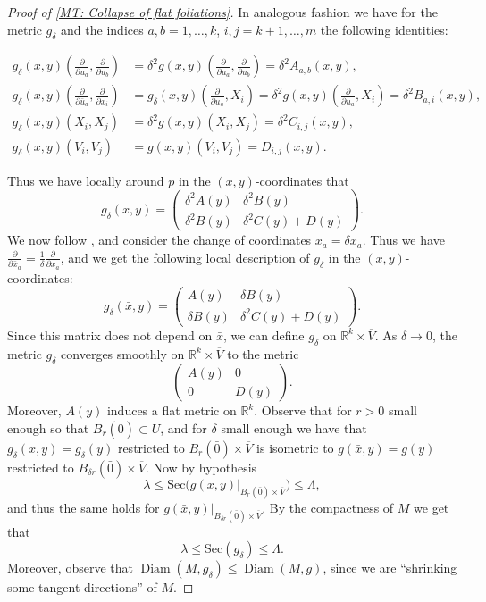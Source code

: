 \documentclass[12pt,a4paper,reqno]{amsart}
\theoremstyle{definition}
\numberwithin{equation}{section}
\newcommand{\R}{\mathbb{R}} %
\newcommand{\Sec}{\mathrm{Sec}}
\DeclareMathOperator{\diam}{Diam}
\begin{document}
\begin{proof}[Proof of \th\ref{MT: Collapse of flat foliations}]
In analogous fashion we have for the metric $g_\delta$ and the indices $a,b=1,\ldots,k$, $i,j=k+1,\ldots,m$ the following identities:
\begin{linenomath}
\begin{align*}
g_\delta(x,y)\left(  \frac{\partial}{\partial u_a},\frac{\partial}{\partial u_b}\right) &= \delta^2 g(x,y)\left(\frac{\partial}{\partial u_a},\frac{\partial}{\partial u_b}\right) =\delta^2 A_{a,b}(x,y),\\
g_\delta(x,y)\left( \frac{\partial}{\partial \bar{u}_a},\frac{\partial}{\partial x_i}\right) &=g_\delta(x,y)\left(\frac{\partial}{\partial u_a},X_i\right) =\delta^2 g(x,y)\left(\frac{\partial}{\partial u_a},X_i\right) = \delta^2 B_{a,i}(x,y),\\
g_\delta(x,y)(X_i,X_j) &= \delta^2g(x,y)(X_i,X_j) = \delta^2 C_{i,j}(x,y),\\
g_\delta(x,y)(V_i,V_j)&= g(x,y)(V_i,V_j) = D_{i,j}(x,y).
\end{align*}
\end{linenomath}
Thus we have locally around $p$ in the $(x,y)$-coordinates that 
\[
g_\delta(x,y)= \begin{pmatrix}
  \delta^2 A(y) & \delta^2 B(y) \\
  \delta^2 B(y) & \delta^2 C(y)+ D(y)
\end{pmatrix}.
\]
We now follow \cite[Proof of Theorem 2.1]{CheegerGromov1986}, and consider the change of coordinates $\bar{x}_a = \delta x_a$. Thus we have $\frac{\partial}{\partial \bar{x}_a} = \frac{1}{\delta}\frac{\partial}{\partial x_a}$, and we get the following local description of $g_\delta$ in the $(\bar{x},y)$-coordinates:
\[
g_\delta(\bar{x},y) = \begin{pmatrix}
  A(y) & \delta B(y) \\
  \delta B(y) & \delta^2 C(y)+ D(y)
\end{pmatrix}.
\]
Since this matrix does not depend on $\bar{x}$, we can define $g_\delta$ on $\R^{k}\times \overline{V}$. As $\delta\to 0$, the metric $g_\delta$ converges smoothly on $\R^{k}\times \overline{V}$ to the metric
\[
\begin{pmatrix}
A(y) & 0 \\
0 & D(y)
\end{pmatrix}.
\]
Moreover, $A(y)$ induces a flat metric on $\R^{k}$. Observe that for $r>0$ small enough so that $B_r(\bar{0})\subset \overline{U}$, and for $\delta$ small enough we have that $g_\delta(x,y) = g_\delta(y)$ restricted to $B_{r}(\bar{0})\times\overline{V}$ is isometric to $g(\bar{x},y) = g(y)$ restricted to $B_{\delta r}(\bar{0})\times\overline{V}$. Now by hypothesis
\[
\lambda\leq \Sec\Big(g(x,y)|_{B_{r}(\bar{0})\times\overline{V}}\Big)\leq \Lambda,
\]
and thus the same holds for $g(\bar{x},y)|_{B_{\delta r}(\bar{0})\times\overline{V}}$. By the compactness of $M$ we get that 
\[
\lambda\leq \Sec(g_\delta)\leq \Lambda.
\]
Moreover, observe that $\diam(M,g_\delta)\leq \diam(M,g)$, since we are ``shrinking some tangent directions'' of $M$.


\end{proof}
\end{document}
